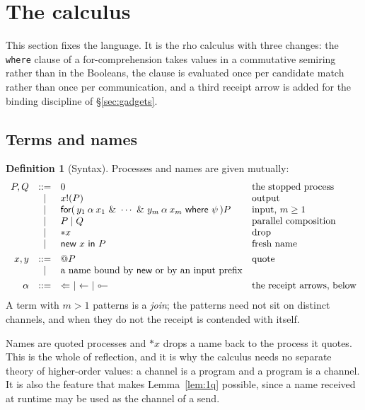 \documentclass[11pt,a4paper]{article}
\theoremstyle{plain}
\theoremstyle{definition}
\newtheorem{definition}[theorem]{Definition}
\theoremstyle{remark}
\newcommand{\lolli}{\mathrel{\reflectbox{$\multimap$}}}
\begin{document}
\section{The calculus}\label{sec:calculus}

This section fixes the language. It is the rho calculus \cite{MeredithRadestock}
with three changes: the \texttt{where} clause of a for-comprehension takes
values in a commutative semiring rather than in the Booleans, the clause is
evaluated once per candidate match rather than once per communication, and a
third receipt arrow is added for the binding discipline of
\S\ref{sec:gadgets}.

\subsection{Terms and names}

\begin{definition}[Syntax]\label{def:syntax}
Processes and names are given mutually:
\[
\begin{array}{rcll}
  P,Q &::=& 0 & \text{the stopped process}\\
      &\mid& x!(P) & \text{output}\\
      &\mid& \textsf{for}(\,y_1 \mathbin{\alpha} x_1 \ \&\ \cdots
             \ \&\ y_m \mathbin{\alpha} x_m \ \textsf{where}\ \psi\,)P
             & \text{input, } m \geq 1\\
      &\mid& P \mid Q & \text{parallel composition}\\
      &\mid& {*}x & \text{drop}\\
      &\mid& \textsf{new}\ x\ \textsf{in}\ P & \text{fresh name}\\[4pt]
  x,y &::=& @P & \text{quote}\\
      &\mid& \text{a name bound by \textsf{new} or by an input prefix}\\[4pt]
  \alpha &::=& \Leftarrow \ \mid\ \leftarrow \ \mid\ \lolli
             & \text{the receipt arrows, below}
\end{array}
\]
A term with $m > 1$ patterns is a \emph{join}; the patterns need not sit on
distinct channels, and when they do not the receipt is contended with itself.
\end{definition}

Names are quoted processes and $*x$ drops a name back to the process it quotes.
This is the whole of reflection, and it is why the calculus needs no separate
theory of higher-order values: a channel is a program and a program is a
channel. It is also the feature that makes Lemma~\ref{lem:1q} possible, since a
name received at runtime may be used as the channel of a send.
\end{document}
